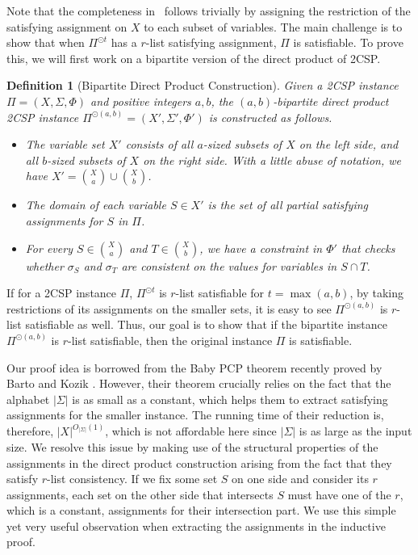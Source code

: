 \documentclass[10pt,a4paper]{article}
\newtheorem{definition}[theorem]{Definition}
\begin{document}
Note that the completeness in~ follows trivially by assigning the restriction of the satisfying assignment on $X$ to each subset of variables. The main challenge is to show that when $\Pi^{\odot t}$ has a $r$-list satisfying assignment, $\Pi$ is satisfiable. To prove this, we will first work on a bipartite version of the direct product of 2CSP. 
\begin{definition}[Bipartite Direct Product Construction]
    Given a 2CSP instance $\Pi=(X,\Sigma,\Phi)$ and positive integers $a,b$, the $(a,b)$-bipartite direct product 2CSP instance $\Pi^{\odot (a,b)}=(X',\Sigma',\Phi')$ is constructed as follows.
    \begin{itemize}
        \item The variable set $X'$ consists of all $a$-sized subsets of $X$ on the left side, and all $b$-sized subsets of $X$ on the right side. With a little abuse of notation, we have $X' = \binom{X}{a} \cup \binom{X}{b}$.
        \item The domain of each variable $S \in X'$ is the set of all partial satisfying assignments for $S$ in $\Pi$. %
        \item For every $S \in \binom{X}{a}$ and $ T \in \binom{X}{b}$, we have a constraint in $\Phi'$ that checks whether $\sigma_S$ and $\sigma_T$ are consistent on the values for variables in $S \cap T$. 
    \end{itemize} 
\end{definition}

If for a 2CSP instance $\Pi$, $\Pi^{\odot t}$ is $r$-list satisfiable for $t=\max(a,b)$, by taking restrictions of its assignments on the smaller sets, it is easy to see $\Pi^{\odot(a,b)}$ is $r$-list satisfiable as well.
Thus, our goal is to show that if the bipartite instance $\Pi^{\odot(a,b)}$ is $r$-list satisfiable, then the original instance $\Pi$ is satisfiable.  

Our proof idea is borrowed from the Baby PCP theorem recently proved by Barto and Kozik \cite{BK22}. However, their theorem crucially relies on the fact that the alphabet $|\Sigma|$ is as small as a constant, which helps them to extract satisfying assignments for the smaller instance. The running time of their reduction is, therefore, $|X|^{O_{|\Sigma|}(1)}$, which is not affordable here since $|\Sigma|$ is as large as the input size. We resolve this issue by making use of the structural properties of the assignments in the direct product construction arising from the fact that they satisfy $r$-list consistency. 
If we fix some set $S$ on one side and consider its $r$ assignments, each set on the other side that intersects $S$ must have one of the $r$, which is a constant, assignments for their intersection part. We use this simple yet very useful observation when extracting the assignments in the inductive proof. 
\end{document}
